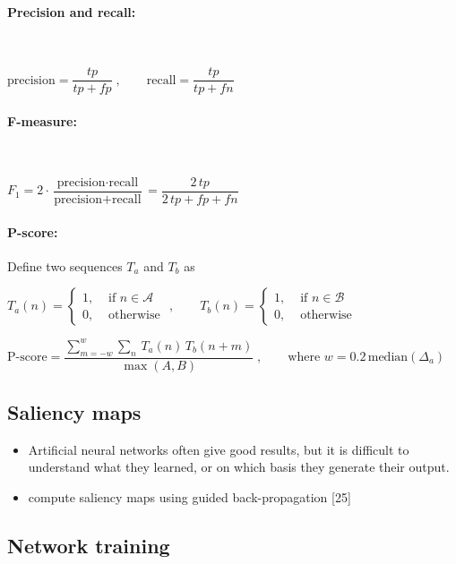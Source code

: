 \documentclass{scrartcl}
\begin{document}
\paragraph{Precision and recall:} $ $

$\text{precision} = \dfrac{tp}{tp + fp}\;, \qquad \text{recall} = \dfrac{tp}{tp + fn}$


\paragraph{F-measure:} $ $

$F_1 = 2 \cdot \dfrac{\text{precision} \cdot \text{recall}}{\text{precision} + \text{recall}} = \dfrac{2\, tp}{2\, tp + fp + fn}$

\paragraph{P-score:} Define two sequences $T_a$ and $T_b$ as 

$T_a(n) = \begin{cases}
	1, &\text{ if } n \in \mathcal A \\
	0 , & \text{ otherwise }
\end{cases}, \qquad T_b(n) = \begin{cases}
	1, &\text{ if } n \in \mathcal B \\
	0 , & \text{ otherwise }
\end{cases}$

$\text{P-score} = \dfrac{\displaystyle \sum_{m=-w}^w  \sum_{n}\,  T_a(n)\,  T_b(n+m)}{\max(A,B)} \;, \qquad \text{where } w = 0.2 \, \text{median}(\Delta_a)$ 



\subsection{Saliency maps}

\begin{itemize}
\item Artificial neural networks often give good results, but it is difficult to understand what they learned, or on which basis they generate their output.
\item compute saliency maps using guided back-propagation [25]
\end{itemize}



\subsection{Network training}
\end{document}

